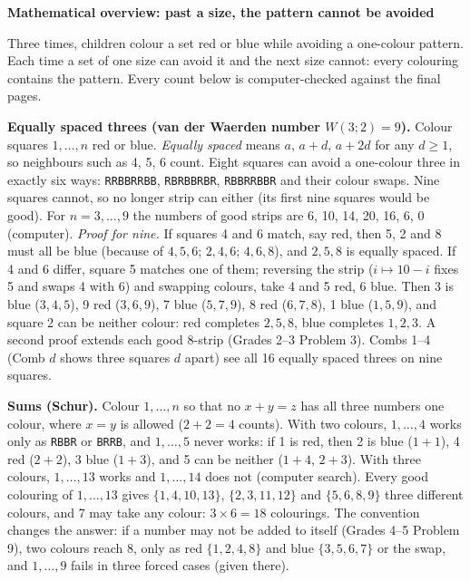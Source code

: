 \documentclass[11pt]{article}
\newcommand{\head}[1]{\par\needspace{8\baselineskip}\medskip\textbf{\large #1}\par}
\newcommand{\st}[1]{\texttt{#1}}
\begin{document}
\head{Mathematical overview: past a size, the pattern cannot be avoided}
Three times, children colour a set red or blue while avoiding a one-colour pattern. Each time a set of one size can avoid it and the next size cannot: every colouring contains the pattern. Every count below is computer-checked against the final pages.

\textbf{Equally spaced threes (van der Waerden number $W(3;2)=9$).} Colour squares $1,\dots,n$ red or blue. \emph{Equally spaced} means $a,\,a+d,\,a+2d$ for any $d\ge1$, so neighbours such as 4, 5, 6 count. Eight squares can avoid a one-colour three in exactly six ways: \st{RRBBRRBB}, \st{RBRBBRBR}, \st{RBBRRBBR} and their colour swaps. Nine squares cannot, so no longer strip can either (its first nine squares would be good). For $n=3,\dots,9$ the numbers of good strips are 6, 10, 14, 20, 16, 6, 0 (computer). \emph{Proof for nine.} If squares 4 and 6 match, say red, then 5, 2 and 8 must all be blue (because of $4,5,6$; $2,4,6$; $4,6,8$), and $2,5,8$ is equally spaced. If 4 and 6 differ, square 5 matches one of them; reversing the strip ($i\mapsto 10-i$ fixes 5 and swaps 4 with 6) and swapping colours, take 4 and 5 red, 6 blue. Then 3 is blue ($3,4,5$), 9 red ($3,6,9$), 7 blue ($5,7,9$), 8 red ($6,7,8$), 1 blue ($1,5,9$), and square 2 can be neither colour: red completes $2,5,8$, blue completes $1,2,3$. A second proof extends each good 8-strip (Grades 2--3 Problem 3). Combs 1--4 (Comb $d$ shows three squares $d$ apart) see all 16 equally spaced threes on nine squares.

\textbf{Sums (Schur).} Colour $1,\dots,n$ so that no $x+y=z$ has all three numbers one colour, where $x=y$ is allowed ($2+2=4$ counts). With two colours, $1,\dots,4$ works only as \st{RBBR} or \st{BRRB}, and $1,\dots,5$ never works: if 1 is red, then 2 is blue ($1+1$), 4 red ($2+2$), 3 blue ($1+3$), and 5 can be neither ($1+4$, $2+3$). With three colours, $1,\dots,13$ works and $1,\dots,14$ does not (computer search). Every good colouring of $1,\dots,13$ gives $\{1,4,10,13\}$, $\{2,3,11,12\}$ and $\{5,6,8,9\}$ three different colours, and 7 may take any colour: $3\times 6=18$ colourings. The convention changes the answer: if a number may not be added to itself (Grades 4--5 Problem 9), two colours reach 8, only as red $\{1,2,4,8\}$ and blue $\{3,5,6,7\}$ or the swap, and $1,\dots,9$ fails in three forced cases (given there).
\end{document}
